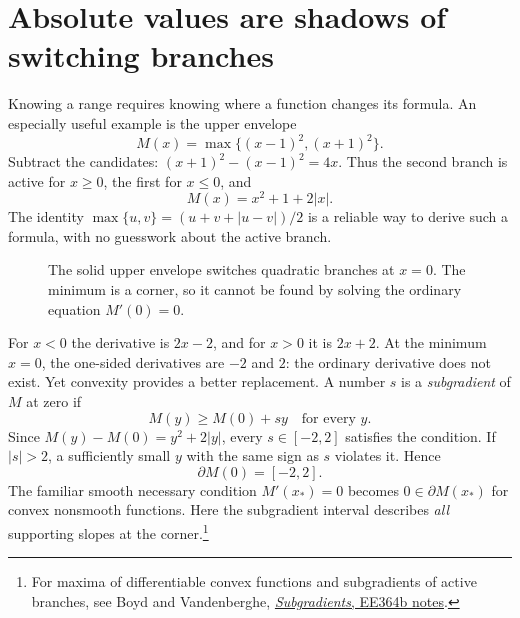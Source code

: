 \section{Absolute values are shadows of switching branches}

Knowing a range requires knowing where a function changes its formula. An especially useful example is the upper envelope
\[
 M(x)=\max\{(x-1)^2,(x+1)^2\}.
\]
Subtract the candidates: $(x+1)^2-(x-1)^2=4x$. Thus the second branch is active for $x\ge0$, the first for $x\le0$, and
\[
 \boxed{M(x)=x^2+1+2|x|.}
\]
The identity $\max\{u,v\}=(u+v+|u-v|)/2$ is a reliable way to derive such a formula, with no guesswork about the active branch.

\begin{figure}[H]
\centering
{}
\caption{The solid upper envelope switches quadratic branches at $x=0$. The minimum is a corner, so it cannot be found by solving the ordinary equation $M'(0)=0$.}
\end{figure}

For $x<0$ the derivative is $2x-2$, and for $x>0$ it is $2x+2$. At the minimum $x=0$, the one-sided derivatives are $-2$ and $2$: the ordinary derivative does not exist. Yet convexity provides a better replacement. A number $s$ is a \emph{subgradient} of $M$ at zero if
\[
 M(y)\ge M(0)+sy\quad\text{for every }y.
\]
Since $M(y)-M(0)=y^2+2|y|$, every $s\in[-2,2]$ satisfies the condition. If $|s|>2$, a sufficiently small $y$ with the same sign as $s$ violates it. Hence
\[
 \boxed{\partial M(0)=[-2,2].}
\]
The familiar smooth necessary condition $M'(x_*)=0$ becomes $0\in\partial M(x_*)$ for convex nonsmooth functions. Here the subgradient interval describes \emph{all} supporting slopes at the corner.\footnote{For maxima of differentiable convex functions and subgradients of active branches, see Boyd and Vandenberghe, \href{https://see.stanford.edu/materials/lsocoee364b/01-subgradients_notes.pdf}{\emph{Subgradients}, EE364b notes}.}

